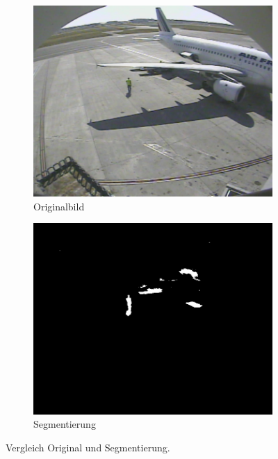 \documentclass[]{scrartcl}
\begin{document}
\begin{figure}[h!]
\centering
\begin{subfigure}{.5\textwidth}
  \centering
  \includegraphics[width=.8\linewidth]{S3A3202_0100.jpeg}
  \caption{Originalbild}
  \label{fig:orig}
\end{subfigure}%
\begin{subfigure}{.5\textwidth}
  \centering
  \includegraphics[width=.8\linewidth]{Seg_S3A3202_0100.jpeg}
  \caption{Segmentierung}
  \label{fig:seg}
\end{subfigure}
\caption{Vergleich Original und Segmentierung.}
\label{fig:vergleich}
\end{figure}
\end{document}
